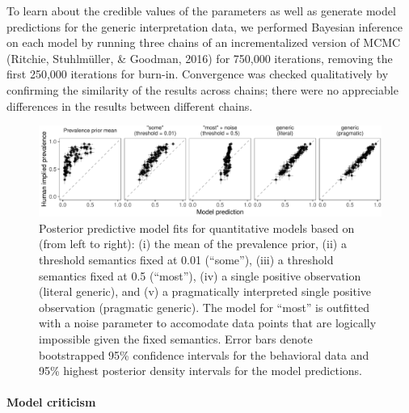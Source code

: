 \documentclass[floatsintext,doc]{apa6}
\let\oldparagraph\paragraph
\renewcommand{\paragraph}[1]{\oldparagraph{#1}\mbox{}}
\begin{document}
To learn about the credible values of the parameters as well as generate model predictions for the generic interpretation data, we performed Bayesian inference on each model by running three chains of an incrementalized version of MCMC (Ritchie, Stuhlmüller, \& Goodman, 2016) for 750,000 iterations, removing the first 250,000 iterations for burn-in.
Convergence was checked qualitatively by confirming the similarity of the results across chains; there were no appreciable differences in the results between different chains.



\begin{figure}
\centering
\includegraphics{genint_files/figure-latex/genint-modelingResults-1.pdf}
\caption{\label{fig:genint-modelingResults}Posterior predictive model fits for quantitative models based on (from left to right): (i) the mean of the prevalence prior, (ii) a threshold semantics fixed at 0.01 (\enquote{some}), (iii) a threshold semantics fixed at 0.5 (\enquote{most}), (iv) a single positive observation (literal generic), and (v) a pragmatically interpreted single positive observation (pragmatic generic). The model for \enquote{most} is outfitted with a noise parameter to accomodate data points that are logically impossible given the fixed semantics. Error bars denote bootstrapped 95\% confidence intervals for the behavioral data and 95\% highest posterior density intervals for the model predictions.}
\end{figure}

\hypertarget{model-criticism}{%
\paragraph{Model criticism}\label{model-criticism}}
\end{document}
